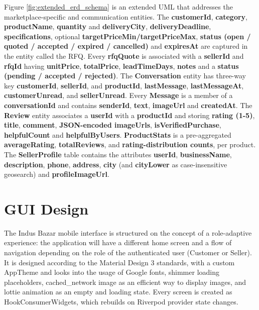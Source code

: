 Figure \ref{fig:extended_erd_schema} is an extended UML that addresses the marketplace-specific and communication entities. The \textbf{customerId}, \textbf{category}, \textbf{productName}, \textbf{quantity} and \textbf{deliveryCity}, \textbf{deliveryDeadline}, \textbf{specifications}, optional \textbf{targetPriceMin/targetPriceMax}, \textbf{status (open / quoted / accepted / expired / cancelled)} and \textbf{expiresAt} are captured in the entity called the RFQ. Every \textbf{rfqQuote} is associated with a \textbf{sellerId} and \textbf{rfqId} having \textbf{unitPrice}, \textbf{totalPrice}, \textbf{leadTimeDays}, \textbf{notes} and a \textbf{status (pending / accepted / rejected)}. The \textbf{Conversation} entity has three-way key \textbf{customerId}, \textbf{sellerId}, and \textbf{productId}, \textbf{lastMessage}, \textbf{lastMessageAt}, \textbf{customerUnread}, and \textbf{sellerUnread}. Every \textbf{Message} is a member of a \textbf{conversationId} and contains \textbf{senderId}, \textbf{text}, \textbf{imageUrl} and \textbf{createdAt}. The \textbf{Review} entity associates a \textbf{userId} with a \textbf{productId} and storing \textbf{rating (1-5)}, \textbf{title}, \textbf{comment}, \textbf{JSON-encoded imageUrls}, \textbf{isVerifiedPurchase}, \textbf{helpfulCount} and \textbf{helpfulByUsers}. \textbf{ProductStats} is a pre-aggregated \textbf{averageRating}, \textbf{totalReviews}, and \textbf{rating-distribution counts}, per product. The \textbf{SellerProfile} table contains the attributes \textbf{userId}, \textbf{businessName}, \textbf{description}, \textbf{phone}, \textbf{address}, \textbf{city} (and \textbf{cityLower} as case-insensitive geosearch) and \textbf{profileImageUrl}.


\section{GUI Design}

The Indus Bazar mobile interface is structured on the concept of a role-adaptive experience: the application will have a different home screen and a flow of navigation depending on the role of the authenticated user (Customer or Seller). It is designed according to the Material Design 3 standards, with a custom AppTheme and looks into the usage of Google fonts, shimmer loading placeholders, cached\_network image as an efficient way to display images, and lottie animation as an empty and loading state. Every screen is created as HookConsumerWidgets, which rebuilds on Riverpod provider state changes.

